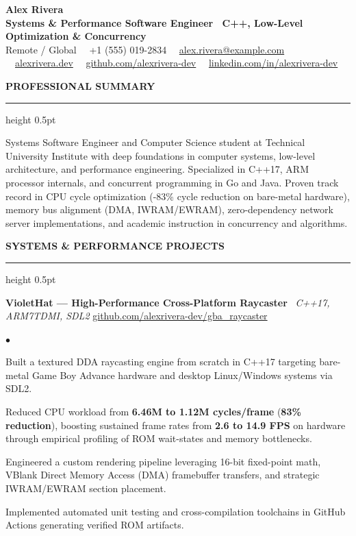 \documentclass[10pt,letterpaper]{article}
\newcommand{\resumesection}[1]{%
  \vspace{2pt}%
  {\color{primary}\normalsize\bfseries\MakeUppercase{#1}}%
  \vspace{1pt}\hrule height 0.5pt\vspace{2pt}%
}
\renewenvironment{itemize}{%
  \begin{list}{\color{primary}$\bullet$}{%
    \setlength{\leftmargin}{1.1em}%
    \setlength{\itemsep}{0.5pt}%
    \setlength{\topsep}{1pt}%
    \setlength{\parsep}{0pt}%
    \setlength{\partopsep}{0pt}%
  }%
}{%
  \end{list}%
}
\begin{document}
\color{textdark}

\begin{center}
    {\LARGE \textbf{\color{primary} Alex Rivera}} \\ \vspace{1.5pt}
    {\large \textbf{Systems \& Performance Software Engineer \textbar\ C++, Low-Level Optimization \& Concurrency}} \\ \vspace{2pt}
    {\small
        Remote / Global \ \textbullet \
        +1 (555) 019-2834 \ \textbullet \
        \href{mailto:alex.rivera@example.com}{alex.rivera@example.com} \ \textbullet \
        \href{https://alexrivera.dev}{alexrivera.dev} \ \textbullet \
        \href{https://github.com/alexrivera-dev}{github.com/alexrivera-dev} \ \textbullet \
        \href{https://linkedin.com/in/alexrivera-dev}{linkedin.com/in/alexrivera-dev}
    }
\end{center}

\vspace{-6pt}

\resumesection{Professional Summary}
{\small Systems Software Engineer and Computer Science student at Technical University Institute with deep foundations in computer systems, low-level architecture, and performance engineering. Specialized in C++17, ARM processor internals, and concurrent programming in Go and Java. Proven track record in CPU cycle optimization (-83\% cycle reduction on bare-metal hardware), memory bus alignment (DMA, IWRAM/EWRAM), zero-dependency network server implementations, and academic instruction in concurrency and algorithms.}

\resumesection{Systems \& Performance Projects}

\textbf{VioletHat — High-Performance Cross-Platform Raycaster} \textbar\ \textit{C++17, ARM7TDMI, SDL2} \hfill \href{https://github.com/alexrivera-dev/gba_raycaster}{github.com/alexrivera-dev/gba\_raycaster}
\begin{itemize}
    \item Built a textured DDA raycasting engine from scratch in C++17 targeting bare-metal Game Boy Advance hardware and desktop Linux/Windows systems via SDL2.
    \item Reduced CPU workload from \textbf{6.46M to 1.12M cycles/frame} (\textbf{83\% reduction}), boosting sustained frame rates from \textbf{2.6 to 14.9 FPS} on hardware through empirical profiling of ROM wait-states and memory bottlenecks.
    \item Engineered a custom rendering pipeline leveraging 16-bit fixed-point math, VBlank Direct Memory Access (DMA) framebuffer transfers, and strategic IWRAM/EWRAM section placement.
    \item Implemented automated unit testing and cross-compilation toolchains in GitHub Actions generating verified ROM artifacts.
\end{itemize}
\end{document}
